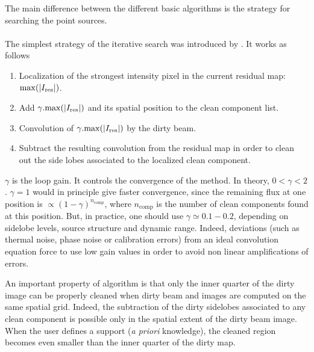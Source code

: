 The main difference between the different basic \clean{} algorithms is the
strategy for searching the point sources.

\paragraph{}

The simplest strategy of the iterative search was introduced by
\cite{hogbom74}. It works as follows
\begin{enumerate}
\item Localization of the strongest intensity pixel in the current residual
  map: $\mathrm{max}(\left| I_{\mathrm{res}} \right|)$.
\item Add $\gamma.\mathrm{max}(\left| I_{\mathrm{res}} \right|)$ and its spatial position to
  the clean component list.
\item Convolution of $\gamma.\mathrm{max}(\left| I_{\mathrm{res}} \right|)$ by the dirty
  beam.
\item Subtract the resulting convolution from the residual map in order to
  clean out the side lobes associated to the localized clean component.
\end{enumerate}
$\gamma$ is the loop gain. It controls the convergence of the method. In
theory, $ 0 < \gamma < 2$. $ \gamma =1$ would in principle give
faster convergence, since the remaining flux at one position is $ \propto
(1-\gamma)^{n_{\mathrm{comp}}}$, where $n_\mathrm{comp}$ is the number of
clean components found at this position. But, in practice, one should use $
\gamma \simeq 0.1 - 0.2$, depending on sidelobe levels, source structure
and dynamic range.  Indeed, deviations (such as thermal noise, phase noise
or calibration errors) from an ideal convolution equation force to use low
gain values in order to avoid non linear amplifications of errors.

An important property of  algorithm is that only the inner
quarter of the dirty image can be properly cleaned when dirty beam and
images are computed on the same spatial grid. Indeed, the subtraction of
the dirty sidelobes associated to any clean component is possible only in
the spatial extent of the dirty beam image. When the user defines a support
(\emph{a priori} knowledge), the cleaned region becomes even smaller than
the inner quarter of the dirty map.

\paragraph{}

